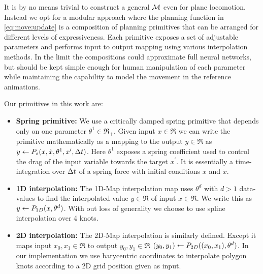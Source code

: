 It is by no means trivial to construct a general $\mathcal{M}$ even for plane locomotion. Instead we opt for a modular approach where the planning function in \eqref{eq:move:update} is a composition of planning primitives that can be arranged for different levels of expressiveness. Each primitive exposes a set of adjustable parameters and performs input to output mapping using various interpolation methods. In the limit the compositions could approximate full neural networks, but should be kept simple enough for human manipulation of each parameter while maintaining the capability to model the movement in the reference animations.     

Our primitives in this work are:

\begin{itemize}
\item{\bf Spring primitive:} We use a critically damped spring primitive that depends only on one parameter $\theta^1 \in \Re_+$. Given input $x \in \Re$ we can write the primitive mathematically as a mapping to the output $y \in \Re$ as $y \leftarrow P_s{( x , \dot{x}, \theta^1, x^\prime, \Delta{t})}$. Here $\theta^1$ exposes a spring coefficient used to control the drag of the input variable towards the target $x^\prime$. It is essentially a time-integration over $\Delta{t}$ of a spring force with initial conditions $x$ and $\dot{x}$.

\item{\bf 1D interpolation:} The 1D-Map interpolation map uses $\theta^d$ with $d>1$ data-values to find the interpolated value $y \in \Re$ of input $x \in \Re$. We write this as  $y \leftarrow P_{1D}(x,\theta^{d})$. With out loss of generality we choose to use spline interpolation over 4 knots.

\item{\bf 2D interpolation:} The 2D-Map interpolation is similarly defined. Except it maps input $x_0,x_1 \in \Re$ to output $y_0,y_1 \in \Re$ $(y_0,y_1) \leftarrow P_{2D}( (x_0, x_1),\theta^{d})$. In our implementation we use barycentric coordinates to interpolate polygon knots according to a 2D grid position given as input.    
\end{itemize}

